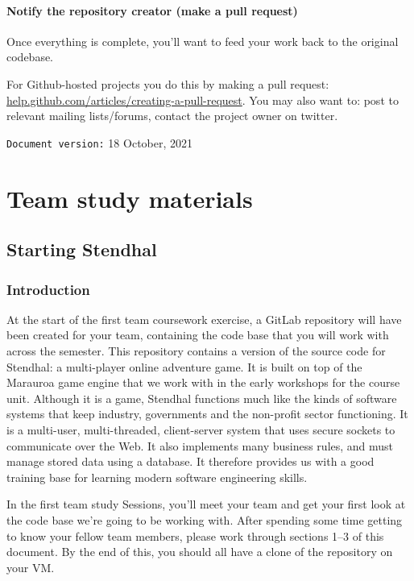 \documentclass[
]{book}
\begin{document}
\hypertarget{pullrequest}{%
\subsection{Notify the repository creator (make a pull request)}\label{pullrequest}}

Once everything is complete, you'll want to feed your work back to the original codebase.

For Github-hosted projects you do this by making a pull request: \href{https://help.github.com/articles/creating-a-pull-request}{help.github.com/articles/creating-a-pull-request}. You may also want to: post to relevant mailing lists/forums, contact the project owner on twitter.

\texttt{Document\ version:} 18 October, 2021

\hypertarget{part-team-study-materials}{%
\part{Team study materials}\label{part-team-study-materials}}

\hypertarget{starting}{%
\chapter{Starting Stendhal}\label{starting}}

\hypertarget{introduction-2}{%
\section{Introduction}\label{introduction-2}}

At the start of the first team coursework exercise, a GitLab repository will have been created for your team, containing the code base that you will work with across the semester. This repository contains a version of the source code for Stendhal: a multi-player online adventure game. It is built on top of the Marauroa game engine that we work with in the early workshops for the course unit. Although it is a game, Stendhal functions much like the kinds of software systems that keep industry, governments and the non-profit sector functioning. It is a multi-user, multi-threaded, client-server system that uses secure sockets to communicate over the Web. It also implements many business rules, and must manage stored data using a database. It therefore provides us with a good training base for learning modern software engineering skills.

In the first team study Sessions, you'll meet your team and get your first look at the code base we're going to be working with. After spending some time getting to know your fellow team members, please work through sections 1--3 of this document. By the end of this, you should all have a clone of the repository on your VM.
\end{document}
